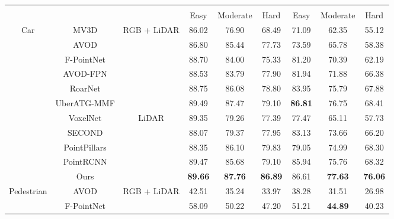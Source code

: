 \documentclass[10pt,twocolumn,letterpaper]{article}
\begin{document}
\begin{table*}[t]
   \centering 
   \footnotesize
   \begin{tabular}{|c|c|c||c|c|c||c|c|c|}
       \hline
       \multicolumn{1}{|c|}{ \multirow{2}{*}{Class}} & \multicolumn{1}{c|}{ \multirow{2}{*}{Method}} & \multicolumn{1}{c||}{ \multirow{2}{*}{Modality}} & \multicolumn{3}{|c||}{}& \multicolumn{3}{|c|}{} \\ \cline{4-9}
       \multicolumn{1}{|c|}{} & \multicolumn{1}{c|}{} & \multicolumn{1}{c||}{} & \multicolumn{1}{|c|}{Easy} & \multicolumn{1}{|c|}{Moderate} & \multicolumn{1}{|c||}{Hard} & \multicolumn{1}{|c|}{Easy} & \multicolumn{1}{|c|}{Moderate} & \multicolumn{1}{|c|}{Hard} \\
       \hline
       \hline
      \multirow {11}{*}{Car} & MV3D \cite{MV3D} & \multirow{6}{*}{RGB + LiDAR}  & 86.02 & 76.90 & 68.49 & 71.09 & 62.35 & 55.12\\
      {} & AVOD \cite{AVOD} & {} & 86.80 &  85.44 & 77.73 & 73.59 & 65.78 & 58.38 \\
      {} & F-PointNet \cite{FPOINTNET} & {} & 88.70 & 84.00 & 75.33 & 81.20 & 70.39 & 62.19 \\ 
      {} & AVOD-FPN \cite{AVOD} & {} & 88.53 & 83.79 &  77.90 &  81.94 & 71.88 &  66.38 \\
      {} & RoarNet \cite{kiwoo2018roar} & {} & 88.75 & 86.08 & 78.80 & 83.95 & 75.79 & 67.88 \\
      {} & UberATG-MMF \cite{Liang2019CVPR} & {} & 89.49 & 87.47 & 79.10 & \bf 86.81 & 76.75 & 68.41 \\ \cline{2-9}
      {} & VoxelNet \cite{VOXELNET} & \multirow{5}{*}{LiDAR} &  89.35 & 79.26 & 77.39 & 77.47 & 65.11 & 57.73 \\
      {} & SECOND \cite{yan2018second} & {} & 88.07  & 79.37 & 77.95 & 83.13 & 73.66 & 66.20 \\
      {} & PointPillars \cite{lang2018pointpillars} & {} & 88.35 & 86.10 & 79.83 & 79.05 & 74.99 & 68.30 \\
      {} & PointRCNN \cite{shi2018pointrcnn} & {} & 89.47 & 85.68 & 79.10 & 85.94 & 75.76 & 68.32 \\
      {} & Ours & {} & \bf 89.66 & \bf 87.76 & \bf 86.89 & 86.61 & \bf 77.63 & \bf 76.06 \\
      \hline
      \hline
      \multirow {8}{*}{Pedestrian} & AVOD \cite{AVOD} & \multirow{3}{*}{RGB + LiDAR} & 42.51 & 35.24 & 33.97 & 38.28 & 31.51 & 26.98 \\
      {} & F-PointNet \cite{FPOINTNET} & {} & 58.09 & 50.22 & 47.20 & 51.21 & \bf 44.89 & 40.23 \\ 

\end{tabular}
\end{table*}
\end{document}
